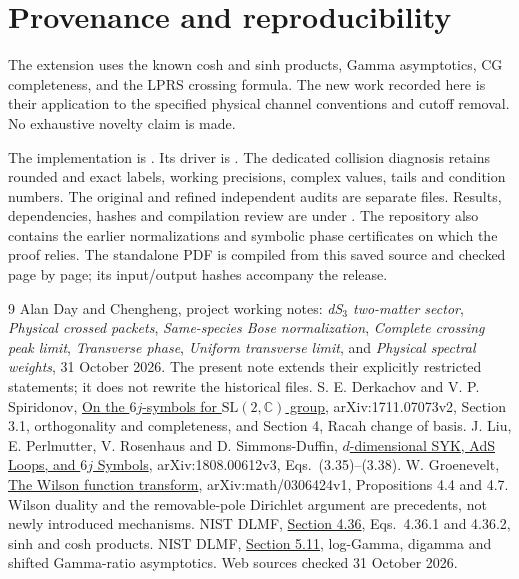 \documentclass[11pt,a4paper]{article}
\begin{document}
\newpage
\section*{Provenance and reproducibility}
The extension uses the known cosh and sinh products, Gamma asymptotics,
CG completeness, and the LPRS crossing formula.
The new work recorded here is their application to the specified
physical channel conventions and cutoff removal.
No exhaustive novelty claim is made.

The implementation is .
Its driver is .
The dedicated collision diagnosis retains rounded and exact labels,
working precisions, complex values, tails and condition numbers.
The original and refined independent audits are separate files.
Results, dependencies, hashes and compilation review are under
.
The repository also contains the earlier normalizations and symbolic
phase certificates on which the proof relies.
The standalone PDF is compiled from this saved source and checked
page by page; its input/output hashes accompany the release.

\begin{thebibliography}{9}
 Alan Day and Chengheng, project working notes:
\emph{dS$_3$ two-matter sector}, \emph{Physical crossed packets},
\emph{Same-species Bose normalization},
\emph{Complete crossing peak limit},
\emph{Transverse phase}, \emph{Uniform transverse limit}, and
\emph{Physical spectral weights}, 31 October 2026.
The present note extends their explicitly restricted statements;
it does not rewrite the historical files.
 S. E. Derkachov and V. P. Spiridonov,
\href{https://arxiv.org/html/1711.07073v2}
{On the $6j$-symbols for $\mathrm{SL}(2,\mathbb C)$ group},
arXiv:1711.07073v2, Section 3.1, orthogonality and completeness,
and Section 4, Racah change of basis.
 J. Liu, E. Perlmutter, V. Rosenhaus and D. Simmons-Duffin,
\href{https://arxiv.org/html/1808.00612v3}
{$d$-dimensional SYK, AdS Loops, and $6j$ Symbols},
arXiv:1808.00612v3, Eqs.\ (3.35)--(3.38).
 W. Groenevelt,
\href{https://arxiv.org/html/math/0306424v1}{The Wilson function transform},
arXiv:math/0306424v1, Propositions 4.4 and 4.7.
Wilson duality and the removable-pole Dirichlet argument are precedents,
not newly introduced mechanisms.
 NIST DLMF,
\href{https://dlmf.nist.gov/4.36}{Section 4.36},
Eqs.\ 4.36.1 and 4.36.2, sinh and cosh products.
 NIST DLMF,
\href{https://dlmf.nist.gov/5.11}{Section 5.11},
log-Gamma, digamma and shifted Gamma-ratio asymptotics.
Web sources checked 31 October 2026.
\end{thebibliography}
\end{document}
